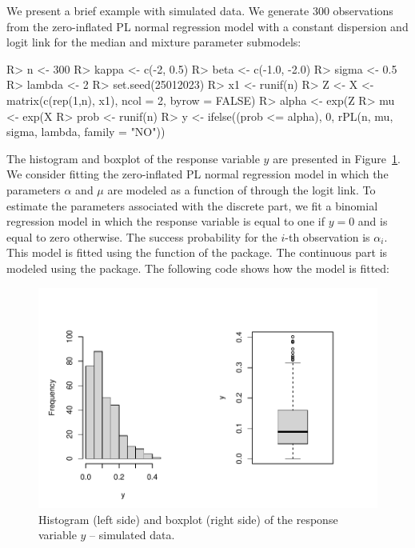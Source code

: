We present a brief example with simulated data. We generate 300 observations from the zero-inflated PL normal regression model with a constant dispersion and logit link for the median and mixture parameter submodels:  
%
\begin{Schunk}
\begin{Sinput}
R> n <- 300
R> kappa <- c(-2, 0.5)
R> beta <- c(-1.0, -2.0)
R> sigma <- 0.5
R> lambda <- 2
R> set.seed(25012023)
R> x1 <- runif(n)
R> Z <- X <- matrix(c(rep(1,n), x1), ncol = 2, byrow = FALSE)
R> alpha <- exp(Z%
R> mu <- exp(X%
R> prob <- runif(n)
R> y <- ifelse((prob <= alpha), 0, rPL(n, mu, sigma, lambda, family = "NO"))
\end{Sinput}
\end{Schunk}
%
The histogram and boxplot of the response variable $y$ are presented in Figure~\ref{fig:Fig7}. We consider fitting the zero-inflated PL normal regression model in which the parameters $\alpha$ and $\mu$ are modeled as a function of  through the logit link. To estimate the parameters associated with the discrete part, we fit a binomial regression model in which the response variable is equal to one if $y=0$ and is equal to zero otherwise. The success probability for the $i$-th observation is $\alpha_i$. This model is fitted using the  function \citep{Chambers+Hastie:1992} of the  package. The continuous part is modeled using the  package. The following code shows how the model is fitted:
\begin{figure}[t!]
\centering
\includegraphics[scale=0.8]{figures/Fig7}
\caption{\label{fig:Fig7} Histogram (left side) and boxplot (right side) of the response variable $y$ -- simulated data.}
\end{figure}


